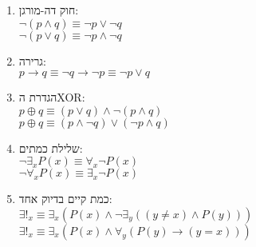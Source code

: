 \documentclass{article}
\begin{document}
\begin{enumerate}[label=.\arabic*]
    \item חוק דה-מורגן: \\
          $\neg \left( p \land q \right) \equiv \neg p \lor \neg q$ \\
          $\neg \left( p \lor q \right) \equiv \neg p \land \neg q$

    \item גרירה: \\
          $p \rightarrow q \equiv \neg q \rightarrow \neg p \equiv \neg p \lor q$

    \item הגדרת הXOR: \\
          $p \oplus q \equiv \left( p \lor q \right) \land \neg \left( p \land q \right)$ \\
          $p \oplus q \equiv (p \land \neg q) \lor (\neg p \land q)$
    \item שלילת כמתים: \\
          $\neg \exists_x P(x) \equiv \forall_x \neg P(x)$ \\
          $\neg \forall_x P(x) \equiv \exists_x \neg P(x)$
    \item כמת קיים בדיוק אחד: \\
          $\exists!_x \equiv \exists_x \left(P(x) \land \neg \exists_y \left((y \neq x) \land P(y) \right) \right)$ \\
          $\exists!_x \equiv \exists_x \left(P(x) \land \forall_y \left(P(y) \rightarrow (y = x) \right) \right)$

\end{enumerate}
\end{document}
